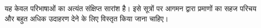 \documentclass[../../../include/open-logic-chapter]{subfiles}
\begin{document}

\begin{editorial}
  यह केवल परिभाषाओं का अत्यंत संक्षिप्त सारांश है। इसे सूत्रों पर आगमन द्वारा
  प्रमाणों का सहज परिचय और बहुत अधिक उदाहरण देने के लिए विस्तृत किया जाना
  चाहिए।
\end{editorial}







\OLEndChapterHook
\end{document}
